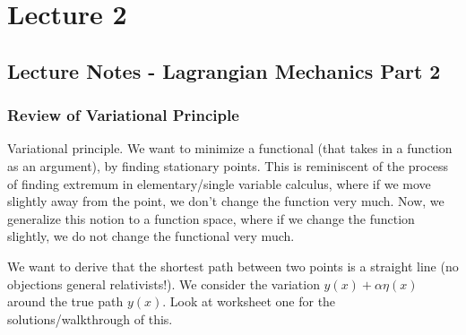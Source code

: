 \documentclass[../PHYS306Notes.tex]{subfiles}
\begin{document}
\section{Lecture 2}
\subsection{Lecture Notes - Lagrangian Mechanics Part 2}
\subsubsection{Review of Variational Principle}
Variational principle. We want to minimize a functional (that takes in a function as an argument), by finding stationary points. This is reminiscent of the process of finding extremum in elementary/single variable calculus, where if we move slightly away from the point, we don't change the function very much. Now, we generalize this notion to a function space, where if we change the function slightly, we do not change the functional very much.

\noindent We want to derive that the shortest path between two points is a straight line (no objections general relativists!). We consider the variation $y(x) + \alpha\eta(x)$ around the true path $y(x)$. Look at worksheet one for the solutions/walkthrough of this.
\end{document}
